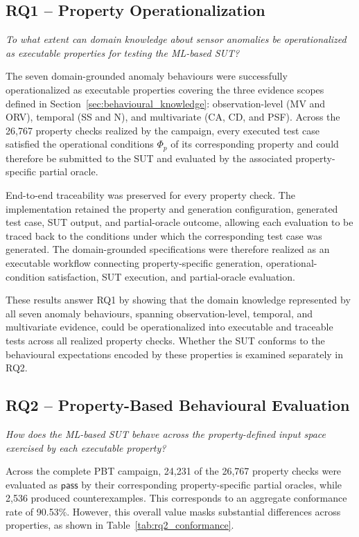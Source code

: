 \documentclass[preprint,12pt]{elsarticle}
\begin{document}
\subsection{RQ1 -- Property Operationalization}
\label{sec:results_rq1}

\noindent\textit{To what extent can domain knowledge about sensor anomalies
be operationalized as executable properties for testing the ML-based SUT?}

The seven domain-grounded anomaly behaviours were successfully
operationalized as executable properties covering the three evidence scopes
defined in Section~\ref{sec:behavioural_knowledge}: observation-level
(MV and ORV), temporal (SS and N), and multivariate (CA, CD, and PSF).
Across the 26,767 property checks realized by the campaign, every executed
test case satisfied the operational conditions \(\Phi_p\) of its
corresponding property and could therefore be submitted to the SUT and
evaluated by the associated property-specific partial oracle.

End-to-end traceability was preserved for every property check. The
implementation retained the property and generation configuration, generated
test case, SUT output, and partial-oracle outcome, allowing each evaluation
to be traced back to the conditions under which the corresponding test case
was generated. The domain-grounded specifications were therefore realized
as an executable workflow connecting property-specific generation,
operational-condition satisfaction, SUT execution, and partial-oracle
evaluation.

These results answer RQ1 by showing that the domain knowledge represented by
all seven anomaly behaviours, spanning observation-level, temporal, and
multivariate evidence, could be operationalized into executable and traceable
tests across all realized property checks. Whether the SUT conforms to the
behavioural expectations encoded by these properties is examined separately
in RQ2.

\subsection{RQ2 -- Property-Based Behavioural Evaluation}
\label{sec:results_rq2}

\noindent\textit{How does the ML-based SUT behave across the property-defined
input space exercised by each executable property?}

Across the complete PBT campaign, 24,231 of the 26,767 property checks were
evaluated as \(\mathsf{pass}\) by their corresponding property-specific
partial oracles, while 2,536 produced counterexamples. This corresponds to
an aggregate conformance rate of 90.53\%. However, this overall value masks
substantial differences across properties, as shown in
Table~\ref{tab:rq2_conformance}.
\end{document}
